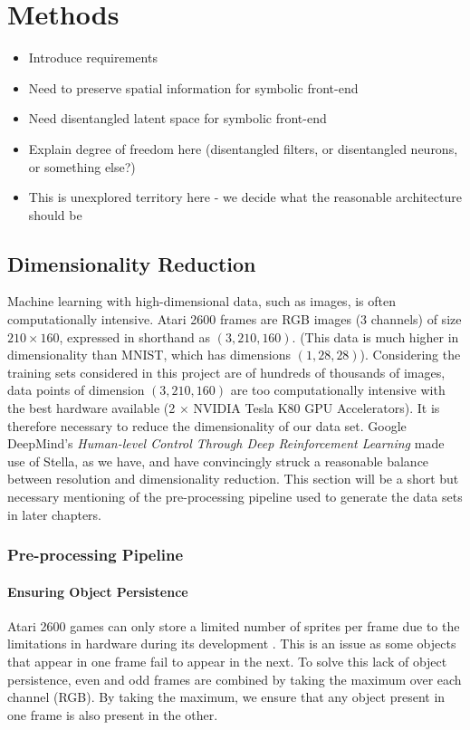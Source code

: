\chapter{Methods}
\begin{itemize}
\item Introduce requirements
\item Need to preserve spatial information for symbolic front-end
\item Need disentangled latent space for symbolic front-end
\item Explain degree of freedom here (disentangled filters, or disentangled neurons, or something else?)
\item This is unexplored territory here - we decide what the reasonable architecture should be
\end{itemize}

\label{ch:methods}


%
%
%
%
%
\section{Dimensionality Reduction}

Machine learning with high-dimensional data, such as images, is often computationally intensive. Atari 2600 frames are RGB images ($3$ channels) of size $210 \times 160$, expressed in shorthand as $(3, 210, 160)$. (This data is much higher in dimensionality than MNIST, which has dimensions $(1, 28, 28)$). Considering the training sets considered in this project are of hundreds of thousands of images, data points of dimension $(3, 210, 160)$ are too computationally intensive with the best hardware available (2 $\times$ NVIDIA Tesla K80 GPU Accelerators). It is therefore necessary to reduce the dimensionality of our data set. Google DeepMind's \textit{Human-level Control Through Deep Reinforcement Learning} \cite{Mnih2015} made use of Stella, as we have, and have convincingly struck a reasonable balance between resolution and dimensionality reduction. This section will be a short but necessary mentioning of the pre-processing pipeline used to generate the data sets in later chapters.

\subsection{Pre-processing Pipeline}

\subsubsection{Ensuring Object Persistence}
Atari 2600 games can only store a limited number of sprites per frame due to the limitations in hardware during its development \cite{Mnih2015}. This is an issue as some objects that appear in one frame fail to appear in the next. To solve this lack of object persistence, even and odd frames are combined by taking the maximum over each channel (RGB). By taking the maximum, we ensure that any object present in one frame is also present in the other. 

